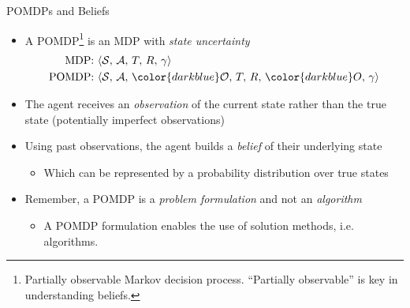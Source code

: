 \begin{frame}[fragile]{POMDPs and Beliefs}

\begin{itemize}
    \item A POMDP\footnote{Partially observable Markov decision process. ``Partially observable'' is key in understanding beliefs.} is an MDP with \textit{state uncertainty}
    \begin{align*}
        \text{MDP: }& \langle \mathcal{S},\, \mathcal{A},\, T,\, R,\, \gamma \rangle\\
        \text{POMDP: }& \langle \mathcal{S},\, \mathcal{A},\, {\color{darkblue}\mathcal{O}},\, T,\, R,\, {\color{darkblue}O},\, \gamma \rangle
    \end{align*}
    \item The agent receives an \textit{observation} of the current state rather than the true state (potentially imperfect observations)
    \item Using past observations, the agent builds a \textit{belief} of their underlying state
    \begin{itemize}
        \item Which can be represented by a probability distribution over true states
    \end{itemize}
    \item Remember, a POMDP is a \textit{problem formulation} and not an \textit{algorithm}
    \begin{itemize}
        \item A POMDP formulation enables the use of solution methods, i.e. algorithms.
    \end{itemize}
\end{itemize}

\end{frame}